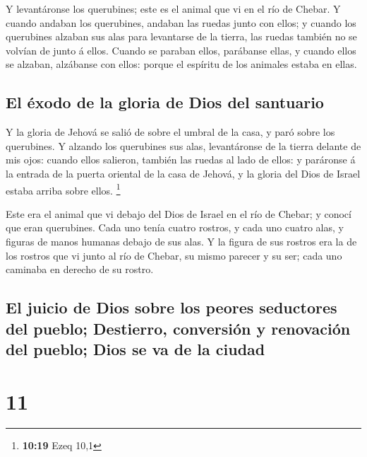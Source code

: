  Y levantáronse los querubines; este es el animal que vi
en el río de Chebar.  Y cuando andaban los querubines,
andaban las ruedas junto con ellos; y cuando los querubines alzaban sus
alas para levantarse de la tierra, las ruedas también no se volvían de
junto á ellos.  Cuando se paraban ellos, parábanse ellas,
y cuando ellos se alzaban, alzábanse con ellos: porque el espíritu de
los animales estaba en ellas.

\hypertarget{el-uxe9xodo-de-la-gloria-de-dios-del-santuario}{%
\subsection{El éxodo de la gloria de Dios del
santuario}\label{el-uxe9xodo-de-la-gloria-de-dios-del-santuario}}

 Y la gloria de Jehová se salió de sobre el umbral de la
casa, y paró sobre los querubines.  Y alzando los
querubines sus alas, levantáronse de la tierra delante de mis ojos:
cuando ellos salieron, también las ruedas al lado de ellos: y paráronse
á la entrada de la puerta oriental de la casa de Jehová, y la gloria del
Dios de Israel estaba arriba sobre ellos. \footnote{\textbf{10:19} Ezeq
  10,1}

 Este era el animal que vi debajo del Dios de Israel en
el río de Chebar; y conocí que eran querubines.  Cada uno
tenía cuatro rostros, y cada uno cuatro alas, y figuras de manos humanas
debajo de sus alas.  Y la figura de sus rostros era la de
los rostros que vi junto al río de Chebar, su mismo parecer y su ser;
cada uno caminaba en derecho de su rostro.

\hypertarget{el-juicio-de-dios-sobre-los-peores-seductores-del-pueblo-destierro-conversiuxf3n-y-renovaciuxf3n-del-pueblo-dios-se-va-de-la-ciudad}{%
\subsection{El juicio de Dios sobre los peores seductores del pueblo;
Destierro, conversión y renovación del pueblo; Dios se va de la
ciudad}\label{el-juicio-de-dios-sobre-los-peores-seductores-del-pueblo-destierro-conversiuxf3n-y-renovaciuxf3n-del-pueblo-dios-se-va-de-la-ciudad}}

\hypertarget{section-10}{%
\section{11}\label{section-10}}

